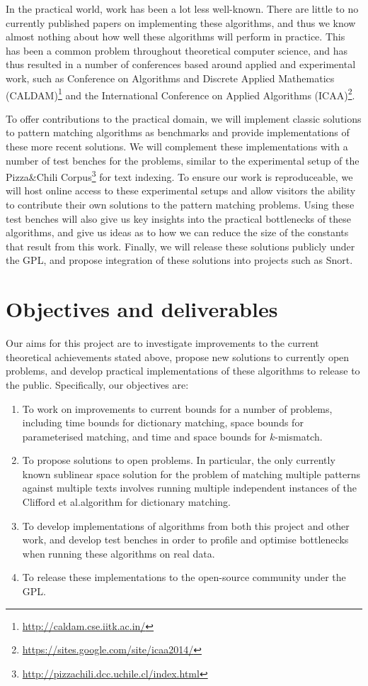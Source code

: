 \documentclass[a4paper,11pt]{article}
\begin{document}
    In the practical world, work has been a lot less well-known. There are little to no currently published papers on implementing these algorithms, and thus we know almost nothing about how well these algorithms will perform in practice. This has been a common problem throughout theoretical computer science, and has thus resulted in a number of conferences based around applied and experimental work, such as Conference on Algorithms and Discrete Applied Mathematics (CALDAM)\footnote{\url{http://caldam.cse.iitk.ac.in/}} and the International Conference on Applied Algorithms (ICAA)\footnote{\url{https://sites.google.com/site/icaa2014/}}.

    To offer contributions to the practical domain, we will implement classic solutions to pattern matching algorithms as benchmarks and provide implementations of these more recent solutions. We will complement these implementations with a number of test benches for the problems, similar to the experimental setup of the Pizza\&Chili Corpus\footnote{\url{http://pizzachili.dcc.uchile.cl/index.html}} for text indexing. To ensure our work is reproduceable, we will host online access to these experimental setups and allow visitors the ability to contribute their own solutions to the pattern matching problems. Using these test benches will also give us key insights into the practical bottlenecks of these algorithms, and give us ideas as to how we can reduce the size of the constants that result from this work. Finally, we will release these solutions publicly under the GPL, and propose integration of these solutions into projects such as Snort.

    \section{Objectives and deliverables}

    Our aims for this project are to investigate improvements to the current theoretical achievements stated above, propose new solutions to currently open problems, and develop practical implementations of these algorithms to release to the public. Specifically, our objectives are:

    \begin{enumerate}
        \item To work on improvements to current bounds for a number of problems, including time bounds for dictionary matching, space bounds for parameterised matching, and time and space bounds for $k$-mismatch.
        \item To propose solutions to open problems. In particular, the only currently known sublinear space solution for the problem of matching multiple patterns against multiple texts involves running multiple independent instances of the Clifford et al.\@ algorithm for dictionary matching.
        \item To develop implementations of algorithms from both this project and other work, and develop test benches in order to profile and optimise bottlenecks when running these algorithms on real data.
        \item To release these implementations to the open-source community under the GPL.
    \end{enumerate}
\end{document}
